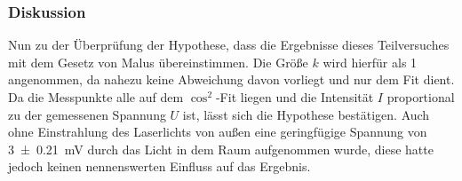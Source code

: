 		\subsubsection*{Diskussion}
			
			Nun zu der Überprüfung der Hypothese, dass die Ergebnisse dieses Teilversuches mit dem Gesetz von Malus übereinstimmen.
			Die Größe $k$ wird hierfür als 1 angenommen, da nahezu keine Abweichung davon vorliegt und nur dem Fit dient.
			Da die Messpunkte alle auf dem $\cos^2$-Fit liegen und die Intensität $I$ proportional zu der gemessenen Spannung $U$ ist, lässt sich die Hypothese bestätigen.
			Auch ohne Einstrahlung des Laserlichts von außen eine geringfügige Spannung von \SI{3+-0,21}{\milli\volt} durch das Licht in dem Raum aufgenommen wurde, diese hatte jedoch keinen nennenswerten Einfluss auf das Ergebnis.
